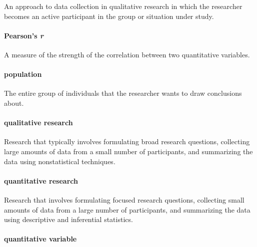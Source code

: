 \documentclass[
]{krantz}
\begin{document}
An approach to data collection in qualitative research in which the researcher becomes an active participant in the group or situation under study.

\hypertarget{pearsons-r}{%
\paragraph*{\texorpdfstring{Pearson's \emph{r}}{Pearson's r}}\label{pearsons-r}}

A measure of the strength of the correlation between two quantitative variables.

\hypertarget{population}{%
\paragraph*{population}\label{population}}

The entire group of individuals that the researcher wants to draw conclusions about.

\hypertarget{qualitative-research}{%
\paragraph*{qualitative research}\label{qualitative-research}}

Research that typically involves formulating broad research questions, collecting large amounts of data from a small number of participants, and summarizing the data using nonstatistical techniques.

\hypertarget{quantitative-research}{%
\paragraph*{quantitative research}\label{quantitative-research}}

Research that involves formulating focused research questions, collecting small amounts of data from a large number of participants, and summarizing the data using descriptive and inferential statistics.

\hypertarget{quantitative-variable}{%
\paragraph*{quantitative variable}\label{quantitative-variable}}
\end{document}
